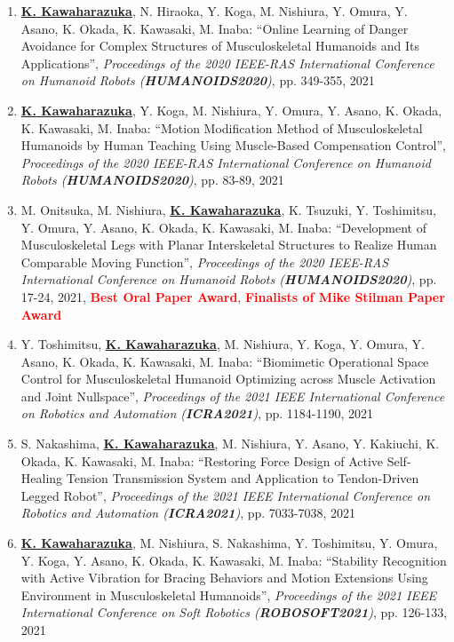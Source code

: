 \documentclass[letterpaper]{article}
\begin{document}
\begin{enumerate}
\item \underline{\textbf{K. Kawaharazuka}}, N. Hiraoka, Y. Koga, M. Nishiura, Y. Omura, Y. Asano, K. Okada, K. Kawasaki, M. Inaba: ``Online Learning of Danger Avoidance for Complex Structures of Musculoskeletal Humanoids and Its Applications'', \textit{Proceedings of the 2020 IEEE-RAS International Conference on Humanoid Robots (\textit{\textbf{HUMANOIDS2020}})}, pp. 349-355, 2021
\item \underline{\textbf{K. Kawaharazuka}}, Y. Koga, M. Nishiura, Y. Omura, Y. Asano, K. Okada, K. Kawasaki, M. Inaba: ``Motion Modification Method of Musculoskeletal Humanoids by Human Teaching Using Muscle-Based Compensation Control'', \textit{Proceedings of the 2020 IEEE-RAS International Conference on Humanoid Robots (\textit{\textbf{HUMANOIDS2020}})}, pp. 83-89, 2021
\item M. Onitsuka, M. Nishiura, \underline{\textbf{K. Kawaharazuka}}, K. Tsuzuki, Y. Toshimitsu, Y. Omura, Y. Asano, K. Okada, K. Kawasaki, M. Inaba: ``Development of Musculoskeletal Legs with Planar Interskeletal Structures to Realize Human Comparable Moving Function'', \textit{Proceedings of the 2020 IEEE-RAS International Conference on Humanoid Robots (\textit{\textbf{HUMANOIDS2020}})}, pp. 17-24, 2021, \textbf{\textcolor{red}{Best Oral Paper Award}}, \textbf{\textcolor{red}{Finalists of Mike Stilman Paper Award}}
\item Y. Toshimitsu, \underline{\textbf{K. Kawaharazuka}}, M. Nishiura, Y. Koga, Y. Omura, Y. Asano, K. Okada, K. Kawasaki, M. Inaba: ``Biomimetic Operational Space Control for Musculoskeletal Humanoid Optimizing across Muscle Activation and Joint Nullspace'', \textit{Proceedings of the 2021 IEEE International Conference on Robotics and Automation (\textit{\textbf{ICRA2021}})}, pp. 1184-1190, 2021
\item S. Nakashima, \underline{\textbf{K. Kawaharazuka}}, M. Nishiura, Y. Asano, Y. Kakiuchi, K. Okada, K. Kawasaki, M. Inaba: ``Restoring Force Design of Active Self-Healing Tension Transmission System and Application to Tendon-Driven Legged Robot'', \textit{Proceedings of the 2021 IEEE International Conference on Robotics and Automation (\textit{\textbf{ICRA2021}})}, pp. 7033-7038, 2021
\item \underline{\textbf{K. Kawaharazuka}}, M. Nishiura, S. Nakashima, Y. Toshimitsu, Y. Omura, Y. Koga, Y. Asano, K. Okada, K. Kawasaki, M. Inaba: ``Stability Recognition with Active Vibration for Bracing Behaviors and Motion Extensions Using Environment in Musculoskeletal Humanoids'', \textit{Proceedings of the 2021 IEEE International Conference on Soft Robotics (\textit{\textbf{ROBOSOFT2021}})}, pp. 126-133, 2021

\end{enumerate}
\end{document}
